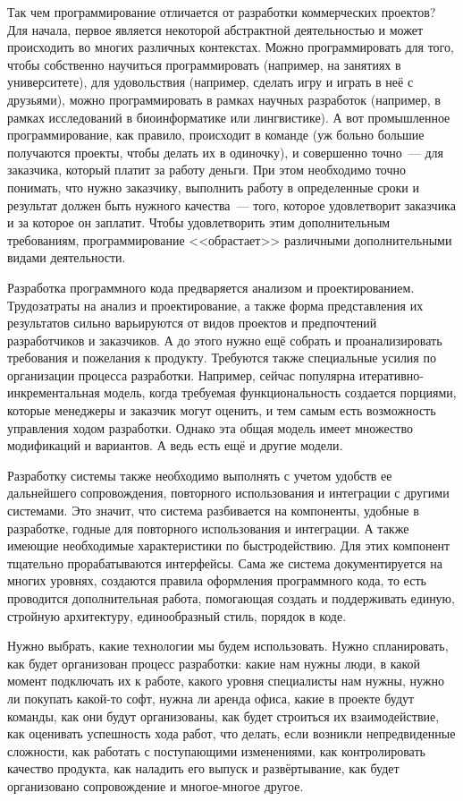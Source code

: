 \documentclass{../../text-style}
\begin{document}
Так чем программирование отличается от разработки коммерческих проектов? Для начала, первое является некоторой абстрактной деятельностью и может происходить во многих различных контекстах. Можно программировать для того, чтобы собственно научиться программировать (например, на занятиях в университете), для удовольствия (например, сделать игру и играть в неё с друзьями), можно программировать в рамках научных разработок (например, в рамках исследований в биоинформатике или лингвистике). А вот промышленное программирование, как правило, происходит в команде (уж больно большие получаются проекты, чтобы делать их в одиночку), и совершенно точно~--- для заказчика, который платит за работу деньги. При этом необходимо точно понимать, что нужно заказчику, выполнить работу в определенные сроки и результат должен быть нужного качества~--- того, которое удовлетворит заказчика и за которое он заплатит. Чтобы удовлетворить этим дополнительным требованиям, программирование <<обрастает>> различными дополнительными видами деятельности.

Разработка программного кода предваряется анализом и проектированием. Трудозатраты на анализ и проектирование, а также форма представления их результатов сильно варьируются от видов проектов и предпочтений разработчиков и заказчиков. А до этого нужно ещё собрать и проанализировать требования и пожелания к продукту. Требуются также специальные усилия по организации процесса разработки. Например, сейчас популярна итеративно-инкрементальная модель, когда требуемая функциональность создается порциями, которые менеджеры и заказчик могут оценить, и тем самым есть возможность управления ходом разработки. Однако эта общая модель имеет множество модификаций и вариантов. А ведь есть ещё и другие модели.

Разработку системы также необходимо выполнять с учетом удобств ее дальнейшего сопровождения, повторного использования и интеграции с другими системами. Это значит, что система разбивается на компоненты, удобные в разработке, годные для повторного использования и интеграции. А также имеющие необходимые характеристики по быстродействию. Для этих компонент тщательно прорабатываются интерфейсы. Сама же система документируется на многих уровнях, создаются правила оформления программного кода, то есть проводится дополнительная работа, помогающая создать и поддерживать единую, стройную архитектуру, единообразный стиль, порядок в коде.

Нужно выбрать, какие технологии мы будем использовать. Нужно спланировать, как будет организован процесс разработки: какие нам нужны люди, в какой момент подключать их к работе, какого уровня специалисты нам нужны, нужно ли покупать какой-то софт, нужна ли аренда офиса, какие в проекте будут команды, как они будут организованы, как будет строиться их взаимодействие, как оценивать успешность хода работ, что делать, если возникли непредвиденные сложности, как работать с поступающими изменениями, как контролировать качество продукта, как наладить его выпуск и развёртывание, как будет организовано сопровождение и многое-многое другое.
\end{document}

